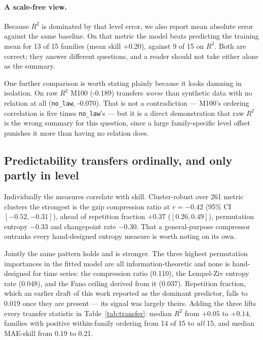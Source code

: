\documentclass[11pt,a4paper]{article}
\newcommand{\num}[1]{#1}
\begin{document}
\paragraph{A scale-free view.} Because \(R^2\) is dominated by that level
error, we also report mean absolute error against the same baseline. On that
metric the model beats predicting the training mean for \num{13} of \num{15}
families (mean skill \num{+0.20}), against \num{9} of \num{15} on \(R^2\).
Both are correct; they answer different questions, and a reader should not take
either alone as the summary.

One further comparison is worth stating plainly because it looks damning in
isolation. On raw \(R^2\) M100 (\num{-0.189}) transfers \emph{worse} than
synthetic data with no relation at all (\texttt{no\_law}, \num{-0.070}). That
is not a contradiction --- M100's ordering correlation is five times
\texttt{no\_law}'s --- but it is a direct demonstration that raw \(R^2\) is the
wrong summary for this question, since a large family-specific level offset
punishes it more than having no relation does.

\subsection{Predictability transfers ordinally, and only partly in level}
\label{sec:linking}

Individually the measures correlate with skill. Cluster-robust over \num{261}
metric clusters the strongest is the gzip compression ratio at \(r=-0.42\)
(95\% CI \([-0.52,-0.31]\)), ahead of repetition fraction \(+0.37\)
(\([0.26,0.49]\)), permutation entropy \(-0.33\) and changepoint rate
\(-0.30\). That a general-purpose compressor outranks every hand-designed
entropy measure is worth noting on its own.

Jointly the same pattern holds and is stronger. The three highest permutation
importances in the fitted model are all information-theoretic and none is
hand-designed for time series: the compression ratio (\num{0.110}), the
Lempel-Ziv entropy rate (\num{0.048}), and the Fano ceiling derived from it
(\num{0.037}). Repetition fraction, which an earlier draft of this work reported
as the dominant predictor, falls to \num{0.019} once they are present --- its
signal was largely theirs. Adding the three lifts every transfer statistic in
Table~\ref{tab:transfer}: median \(R^2\) from \(+0.05\) to \(+0.14\), families
with positive within-family ordering from \num{14} of \num{15} to \emph{all}
\num{15}, and median MAE-skill from \num{0.19} to \num{0.21}.
\end{document}
